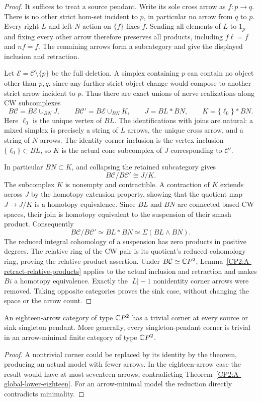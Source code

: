 \begin{proof}
It suffices to treat a source pendant. Write its sole cross
arrow as $f:p\to q$. There is no other strict hom-set incident
to $p$, in particular no arrow from $q$ to $p$.
Every right $L$ and left $N$ action on $\{f\}$ fixes $f$.
Sending all elements of $L$ to $1_p$ and fixing every other
arrow therefore preserves all products, including $f\ell=f$
and $nf=f$. The remaining arrows form a subcategory and give
the displayed inclusion and retraction.

Let $\mathcal E=\mathcal C\setminus\{p\}$ be the full deletion.
A simplex containing $p$ can contain no object other than
$p,q$, since any further strict object change would compose
to another strict arrow incident to $p$. Thus there are exact
unions of nerve realizations along CW subcomplexes
\[
 B\mathcal C=B\mathcal E\cup_{BN}J,
 \qquad B\mathcal C'=B\mathcal E\cup_{BN}K,
 \qquad J=BL*BN,
 \qquad K=\{\ell_0\}*BN.
\]
Here $\ell_0$ is the unique vertex of $BL$. The identifications
with joins are natural: a mixed simplex is precisely a string
of $L$ arrows, the unique cross arrow, and a string of $N$
arrows. The identity-corner inclusion is the vertex inclusion
$\{\ell_0\}\subset BL$, so $K$ is the actual cone subcomplex
of $J$ corresponding to $\mathcal C'$.

In particular $BN\subset K$, and collapsing the retained
subcategory gives
\[
 B\mathcal C/B\mathcal C'\cong J/K.
\]
The subcomplex $K$ is nonempty and contractible. A contraction
of $K$ extends across $J$ by the homotopy extension property,
showing that the quotient map $J\to J/K$ is a homotopy
equivalence. Since $BL$ and $BN$ are connected based CW
spaces, their join is homotopy equivalent to the suspension
of their smash product. Consequently
\[
 B\mathcal C/B\mathcal C'\simeq
 BL*BN\simeq\Sigma(BL\wedge BN).
\]
The reduced integral cohomology of a suspension has zero
products in positive degrees. The relative ring of the CW
pair is its quotient's reduced cohomology ring, proving the
relative-product assertion. Under $B\mathcal C\simeq\mathbb{C}P^2$,
Lemma~\ref{CP2:A-retract-relative-products} applies to the
actual inclusion and retraction and makes $Bi$ a homotopy
equivalence. Exactly the $|L|-1$ nonidentity corner arrows
were removed. Taking opposite categories proves the sink
case, without changing the space or the arrow count.
\end{proof}

\begin{corollary}
\label{CP2:A-singleton-pendant-any-eighteen}
An eighteen-arrow category of type $\mathbb{C}P^2$ has a trivial
corner at every source or sink singleton pendant.
More generally, every singleton-pendant corner is trivial
in an arrow-minimal finite category of type $\mathbb{C}P^2$.
\end{corollary}
\begin{proof}
A nontrivial corner could be replaced by its identity by the
theorem, producing an actual model with fewer arrows. In the
eighteen-arrow case the result would have at most seventeen
arrows, contradicting Theorem~\ref{CP2:A-global-lower-eighteen}.
For an arrow-minimal model the reduction directly contradicts
minimality.
\end{proof}
